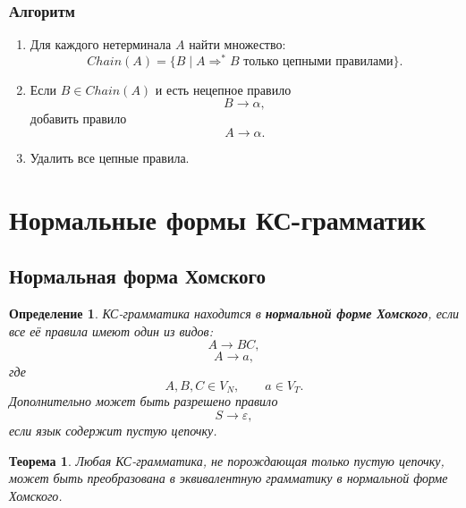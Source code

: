 \documentclass[12pt,a4paper]{article}
\newtheorem{definition}{Определение}
\newtheorem{theorem}{Теорема}
\newcommand{\eps}{\varepsilon}
\newcommand{\derivesstar}{\Rightarrow^{*}}
\begin{document}
\subsubsection*{Алгоритм}

\begin{enumerate}
    \item Для каждого нетерминала $A$ найти множество:
    \[
    Chain(A)=\{B\mid A\derivesstar B \text{ только цепными правилами}\}.
    \]
    \item Если $B\in Chain(A)$ и есть нецепное правило
    \[
    B\to \alpha,
    \]
    добавить правило
    \[
    A\to \alpha.
    \]
    \item Удалить все цепные правила.
\end{enumerate}

\section{Нормальные формы КС-грамматик}

\subsection{Нормальная форма Хомского}

\begin{definition}
КС-грамматика находится в \textbf{нормальной форме Хомского}, если все её правила имеют один из видов:
\[
A\to BC,
\]
\[
A\to a,
\]
где
\[
A,B,C\in V_N,\qquad a\in V_T.
\]
Дополнительно может быть разрешено правило
\[
S\to\eps,
\]
если язык содержит пустую цепочку.
\end{definition}

\begin{theorem}
Любая КС-грамматика, не порождающая только пустую цепочку, может быть преобразована в эквивалентную грамматику в нормальной форме Хомского.
\end{theorem}
\end{document}
